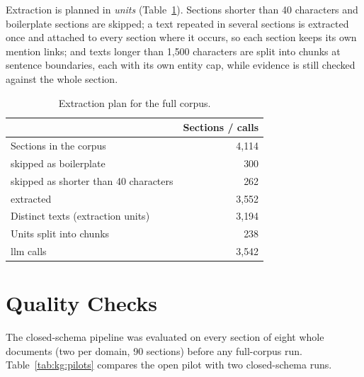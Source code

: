 Extraction is planned in \emph{units} (Table~\ref{tab:kg:plan}). Sections shorter
than 40 characters and boilerplate sections are skipped; a text repeated in several
sections is extracted once and attached to every section where it occurs, so each
section keeps its own mention links; and texts longer than 1{,}500 characters are
split into chunks at sentence boundaries, each with its own entity cap, while
evidence is still checked against the whole section.

\begin{table}[ht]
    \centering
    \caption{Extraction plan for the full corpus.}
    \label{tab:kg:plan}
    \begin{tabular}{lr}
        \toprule
        & Sections / calls \\
        \midrule
        Sections in the corpus             & 4{,}114 \\
        \quad skipped as boilerplate       & 300 \\
        \quad skipped as shorter than 40 characters & 262 \\
        \quad extracted                    & 3{,}552 \\
        Distinct texts (extraction units)  & 3{,}194 \\
        Units split into chunks            & 238 \\
        \midrule
        \gls{llm} calls                    & 3{,}542 \\
        \bottomrule
    \end{tabular}
\end{table}


\section{Quality Checks}\label{sec:kg:quality}

The closed-schema pipeline was evaluated on every section of eight whole documents
(two per domain, 90 sections) before any full-corpus run.
Table~\ref{tab:kg:pilots} compares the open pilot with two closed-schema runs.

